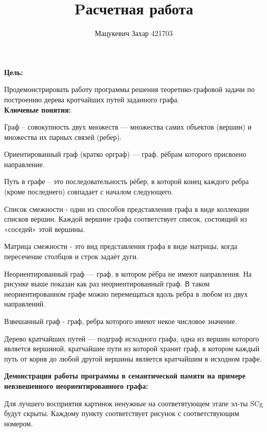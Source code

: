 \documentclass[10pt,a4paper,twocolumn]{article}
\title {\textbf{Pасчетная работа}}
\author{Мацукевич Захар 421703}
\date{}
\begin{document}
\maketitle
\large{\hspace{-0.4cm}\textbf{Цель:}}
\par Продемонстрировать работу программы решения теоретико-графовой задачи по построению дерева кротчайших путей заданного графа.
\\ \large{\textbf {Ключевые понятия:}}
\par Граф – совокупность двух множеств — множества самих объектов (вершин) и множества их парных связей (ребер).
\par Ориентированный граф (кратко орграф) — граф, рёбрам которого присвоено направление.
\par Путь в графе – это последовательность рёбер, в которой конец каждого ребра (кроме последнего) совпадает с началом следующего. 
\par Список смежности - один из способов представления графа в виде коллекции списков вершин. Каждой вершине графа соответствует список, состоящий из «соседей» этой вершины.
\par Матрица смежности - это вид представления графа в виде матрицы, когда пересечение столбцов и строк задаёт дуги.
\par Неориентированный граф — граф, в котором рёбра не имеют направления. На рисунке выше показан как раз неориентированный граф. В таком неориентированном графе можно перемещаться вдоль ребра в любом из двух направлений.
\par Взвешанный граф - граф, ребра которого имеют некое числовое значение.
\par Дерево кратчайших путей — подграф исходного графа, одна из вершин которого является вершиной, кратчайшие пути из которой хранит граф, в котором каждый путь от корня до любой другой вершины является кратчайшим в исходном графе.
\par \large{\hspace{-0.6cm}\textbf{Демонстрация работы программы в семантической памяти на примере невзвешенного неориентированного графа:}}
\par Для лучшего восприятия картинок ненужные на соответвтующем этапе эл-ты SCg будут скрыты. Каждому пункту соответствует рисунок с соответствующим номером.
\end{document}

